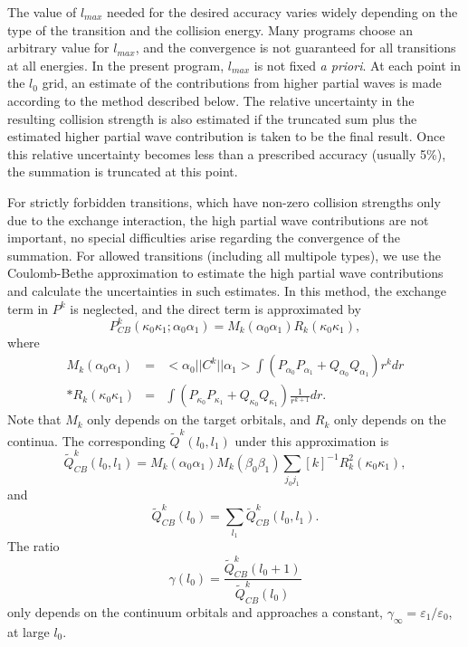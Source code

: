 The value of $l_{max}$ needed for the desired accuracy varies widely depending
on the type of the transition and the collision energy. Many programs choose
an arbitrary value for $l_{max}$, and the convergence is not guaranteed for
all transitions at all energies. In the present program, 
$l_{max}$ is not fixed \textit{a priori}. At each point in the $l_0$ grid, an
estimate of the contributions from higher partial waves is made according to
the method described below. The relative uncertainty in the resulting
collision strength is also estimated if the truncated sum plus the estimated
higher partial wave contribution is taken to be the final result. Once this
relative uncertainty becomes less than a prescribed accuracy (usually 5\%),
the summation is truncated at this point.

For strictly forbidden transitions, which have non-zero collision strengths
only due to the exchange interaction, the high partial wave contributions are
not important, no special difficulties arise regarding the convergence of the
summation. 
For allowed transitions (including all multipole types), we use the
Coulomb-Bethe approximation to estimate the high partial wave contributions
and calculate the uncertainties in such estimates. In this
method, the exchange term in $P^k$ is neglected, and the direct term is
approximated by 
\begin{equation}
\label{eq_PkApprox}
P^k_{CB}(\kappa_0\kappa_1;\alpha_0\alpha_1) = 
M_k(\alpha_0\alpha_1)R_k(\kappa_0\kappa_1),
\end{equation}
where 
\begin{eqnarray}
M_k(\alpha_0\alpha_1) &=& <\alpha_0||C^k||\alpha_1>
\int (P_{\alpha_0}P_{\alpha_1}+Q_{\alpha_0}Q_{\alpha_1})r^kd r \nonumber\\*
R_k(\kappa_0\kappa_1) &=&
\int (P_{\kappa_0}P_{\kappa_1}+Q_{\kappa_0}Q_{\kappa_1})
\frac{1}{r^{k+1}}d r.  
\end{eqnarray}
Note that $M_k$ only depends on the target orbitals, and $R_k$ only depends on
the continua. The corresponding $\tilde{Q}^k(l_0,l_1)$ under this
approximation is 
\begin{equation}
\tilde{Q}^k_{CB}(l_0, l_1) = M_k(\alpha_0\alpha_1)M_k(\beta_0\beta_1)
\sum_{j_0j_1}[k]^{-1}R_k^2(\kappa_0\kappa_1),
\end{equation}
and 
\begin{equation}
\tilde{Q}^k_{CB}(l_0)=\sum_{l_1}\tilde{Q}^k_{CB}(l_0,l_1). 
\end{equation}
The ratio
\begin{equation}
\gamma(l_0) = \frac{\tilde{Q}^k_{CB}(l_0+1)}{\tilde{Q}^k_{CB}(l_0)}
\end{equation}
only depends on the continuum orbitals and approaches a constant,
$\gamma_{\infty}=\varepsilon_1/\varepsilon_0$, at large $l_0$. 


